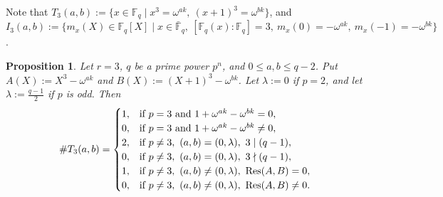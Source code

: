 \documentclass[10pt,a4paper]{article}
\newtheorem{prop}[thm]{Proposition}
\newcommand{\Res}{\operatorname{Res}}
\numberwithin{equation}{section}
\begin{document}
Note that
$T_{3}(a,b):=\{x\in \mathbb{F}_q\mid x^3=\omega^{ak},\ (x+1)^3=\omega^{bk}\}$,
and
$I_{3}(a,b):=\{m_x(X)\in \mathbb{F}_q[X]\mid x\in \bar{\mathbb{F}}_q,\ [\mathbb{F}_q(x):\mathbb{F}_q]=3,\ m_x(0)=-\omega^{ak},\ m_x(-1)=-\omega^{bk}\}$.


\begin{prop}\label{lem:T-layer-r3-general}
Let $r=3$, $q$ be a prime power $p^n$, and $0\le a,b\le q-2$.
Put $A(X):=X^{3}-\omega^{ak}$ and $B(X):=(X+1)^3-\omega^{bk}$.
Let $\lambda:=0$ if $p=2$, and let $\lambda:=\frac{q-1}{2}$ if $p$ is odd.
Then
\[
\#T_3(a,b)=
\begin{cases}
1, & \textup{if } p=3 \textup{ and } 1+\omega^{ak}-\omega^{bk}=0,\\
0, & \textup{if } p=3 \textup{ and } 1+\omega^{ak}-\omega^{bk}\neq0,\\
2, & \textup{if } p\neq3,\ (a,b)=(0,\lambda),\ 3\mid(q-1),\\
0, & \textup{if } p\neq3,\ (a,b)=(0,\lambda),\ 3\nmid(q-1),\\
1, & \textup{if } p\neq3,\ (a,b)\neq(0,\lambda),\ \Res(A,B)=0,\\
0, & \textup{if } p\neq3,\ (a,b)\neq(0,\lambda),\ \Res(A,B)\neq0.
\end{cases}
\]
\end{prop}
\end{document}
